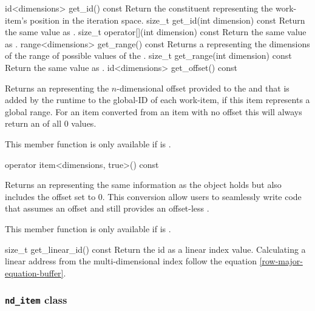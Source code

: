   \addRow
    {id<dimensions> get_id() const}
    {
        Return the constituent 
        representing the work-item's position in the iteration space.
    }
  \addRow
    {size_t get_id(int dimension) const}
    {
      Return the same value as .
    }
  \addRow
    {size_t operator[](int dimension) const}
    {
      Return the same value as .
    }
  \addRow
    {range<dimensions> get_range() const}
    {
      Returns a  representing the dimensions of the
      range of possible values of the .
    }
  \addRow
    {size_t get_range(int dimension) const}
    {
      Return the same value as .
    }
  \addRow
    {id<dimensions> get_offset() const}
    {
      Returns an  representing the $n$-dimensional offset
      provided to the  and that is added by
      the runtime to the global-ID of each work-item, if this item
      represents a global range. For an item converted from an item with
      no offset this will always return an  of all 0 values.

      This member function is only available if  is .
    }
  \addRow
    {operator item<dimensions, true>() const}
    {
      Returns an  representing the same information as the object holds
      but also includes the offset set to 0. This conversion allow users to seamlessly
      write code that assumes an offset and still provides an offset-less .

      This member function is only available if  is .
    }
  \addRow
    {size_t get_linear_id() const}
    {
        Return the id as a linear index value. Calculating a linear
        address from the multi-dimensional index follow the equation 
  \ref{row-major-equation-buffer}.
    }
 \completeTable


\subsubsection{\texttt{nd_item} class}
\label{nditem-class}

